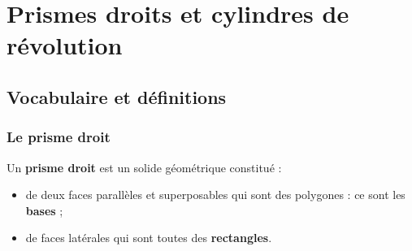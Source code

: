 \documentclass[a4paper]{book}
\begin{document}
\setcounter{chapter}{14}
\renewcommand{\monTitre}{Prismes droits et cylindres de révolution}
\chapter{\monTitre}
\thispagestyle{fancy}


\section{Vocabulaire et définitions}
\subsection{Le prisme droit}

    \begin{definition}
        Un \textbf{prisme droit} est un solide géométrique constitué :
        \begin{itemize}
            \item de deux faces parallèles et superposables qui sont des polygones : ce sont les \textbf{bases} ;
            \item de faces latérales qui sont toutes des \textbf{rectangles}.
        \end{itemize}
    \end{definition}
    
\end{document}
